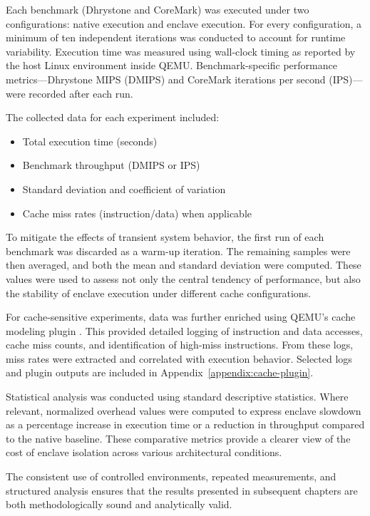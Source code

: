 Each benchmark (Dhrystone and CoreMark) was executed under two configurations: native execution and enclave execution. For every configuration, a minimum of ten independent iterations was conducted to account for runtime variability. Execution time was measured using wall-clock timing as reported by the host Linux environment inside QEMU. Benchmark-specific performance metrics—Dhrystone MIPS (DMIPS) and CoreMark iterations per second (IPS)—were recorded after each run.

The collected data for each experiment included:

\begin{itemize}
    \item Total execution time (seconds)
    \item Benchmark throughput (DMIPS or IPS)
    \item Standard deviation and coefficient of variation
    \item Cache miss rates (instruction/data) when applicable
\end{itemize}

To mitigate the effects of transient system behavior, the first run of each benchmark was discarded as a warm-up iteration. The remaining samples were then averaged, and both the mean and standard deviation were computed. These values were used to assess not only the central tendency of performance, but also the stability of enclave execution under different cache configurations.

For cache-sensitive experiments, data was further enriched using QEMU's cache modeling plugin \cite{mandour2021cache}. This provided detailed logging of instruction and data accesses, cache miss counts, and identification of high-miss instructions. From these logs, miss rates were extracted and correlated with execution behavior. Selected logs and plugin outputs are included in Appendix~\ref{appendix:cache-plugin}.

Statistical analysis was conducted using standard descriptive statistics. Where relevant, normalized overhead values were computed to express enclave slowdown as a percentage increase in execution time or a reduction in throughput compared to the native baseline. These comparative metrics provide a clearer view of the cost of enclave isolation across various architectural conditions.

The consistent use of controlled environments, repeated measurements, and structured analysis ensures that the results presented in subsequent chapters are both methodologically sound and analytically valid.

